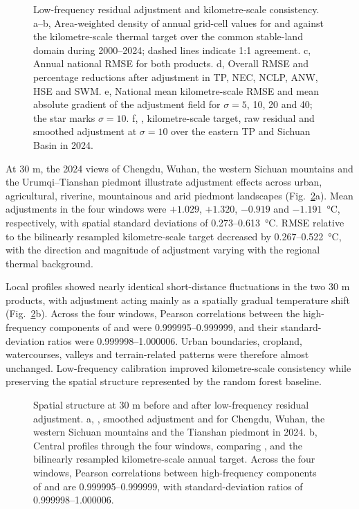 \begin{figure}[H]
\centering
{}
\ReviewFloatBegin
\caption{Low-frequency residual adjustment and kilometre-scale consistency. a--b, Area-weighted density of annual grid-cell values for \rf{} and \chinatherm{} against the kilometre-scale thermal target over the common stable-land domain during 2000--2024; dashed lines indicate 1:1 agreement. c, Annual national RMSE for both products. d, Overall RMSE and percentage reductions after adjustment in TP, NEC, NCLP, ANW, HSE and SWM. e, National mean kilometre-scale RMSE and mean absolute gradient of the adjustment field for $\sigma=5$, 10, 20 and 40; the star marks $\sigma=10$. f, \rf{}, kilometre-scale target, raw residual and smoothed adjustment at $\sigma=10$ over the eastern TP and Sichuan Basin in 2024.}
\label{fig:residual-adjustment}
\ReviewFloatEnd
\end{figure}

At 30 m, the 2024 views of Chengdu, Wuhan, the western Sichuan mountains and the Urumqi--Tianshan piedmont illustrate adjustment effects across urban, agricultural, riverine, mountainous and arid piedmont landscapes (Fig.~\ref*{fig:spatial-detail}a). Mean adjustments in the four windows were $+1.029$, $+1.320$, $-0.919$ and $-1.191$~°C, respectively, with spatial standard deviations of 0.273--0.613~°C. RMSE relative to the bilinearly resampled kilometre-scale target decreased by 0.267--0.522~°C, with the direction and magnitude of adjustment varying with the regional thermal background.

Local profiles showed nearly identical short-distance fluctuations in the two 30 m products, with adjustment acting mainly as a spatially gradual temperature shift (Fig.~\ref*{fig:spatial-detail}b). Across the four windows, Pearson correlations between the high-frequency components of \rf{} and \chinatherm{} were 0.999995--0.999999, and their standard-deviation ratios were 0.999998--1.000006. Urban boundaries, cropland, watercourses, valleys and terrain-related patterns were therefore almost unchanged. Low-frequency calibration improved kilometre-scale consistency while preserving the spatial structure represented by the random forest baseline.

\begin{figure}[H]
\centering
{}
\ReviewFloatBegin
\caption{Spatial structure at 30 m before and after low-frequency residual adjustment. a, \rf{}, smoothed adjustment and \chinatherm{} for Chengdu, Wuhan, the western Sichuan mountains and the Tianshan piedmont in 2024. b, Central profiles through the four windows, comparing \rf{}, \chinatherm{} and the bilinearly resampled kilometre-scale annual target. Across the four windows, Pearson correlations between high-frequency components of \rf{} and \chinatherm{} are 0.999995--0.999999, with standard-deviation ratios of 0.999998--1.000006.}
\label{fig:spatial-detail}
\ReviewFloatEnd
\end{figure}


